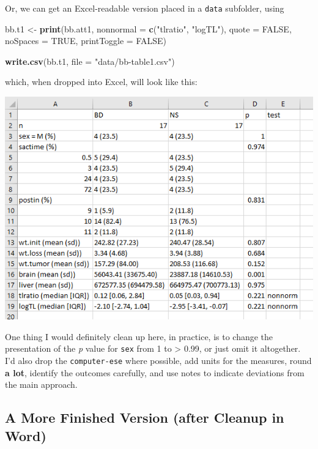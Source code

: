 \documentclass[]{book}
\newenvironment{Shaded}{\begin{snugshade}}{\end{snugshade}}
\newcommand{\KeywordTok}[1]{\textcolor[rgb]{0.13,0.29,0.53}{\textbf{#1}}}
\newcommand{\DataTypeTok}[1]{\textcolor[rgb]{0.13,0.29,0.53}{#1}}
\newcommand{\StringTok}[1]{\textcolor[rgb]{0.31,0.60,0.02}{#1}}
\newcommand{\OtherTok}[1]{\textcolor[rgb]{0.56,0.35,0.01}{#1}}
\newcommand{\NormalTok}[1]{#1}
\theoremstyle{definition}
\theoremstyle{definition}
\theoremstyle{definition}
\theoremstyle{remark}
\begin{document}
Or, we can get an Excel-readable version placed in a \texttt{data}
subfolder, using

\begin{Shaded}
\begin{Highlighting}[]
\NormalTok{bb.t1 <-}\StringTok{ }\KeywordTok{print}\NormalTok{(bb.att1, }\DataTypeTok{nonnormal =} \KeywordTok{c}\NormalTok{(}\StringTok{"tlratio"}\NormalTok{, }\StringTok{"logTL"}\NormalTok{), }\DataTypeTok{quote =} \OtherTok{FALSE}\NormalTok{,}
               \DataTypeTok{noSpaces =} \OtherTok{TRUE}\NormalTok{, }\DataTypeTok{printToggle =} \OtherTok{FALSE}\NormalTok{)}

\KeywordTok{write.csv}\NormalTok{(bb.t1, }\DataTypeTok{file =} \StringTok{"data/bb-table1.csv"}\NormalTok{)}
\end{Highlighting}
\end{Shaded}

which, when dropped into Excel, will look like this:

\includegraphics[width=0.9\linewidth]{images/bb-table1inExcel}

One thing I would definitely clean up here, in practice, is to change
the presentation of the \emph{p} value for \texttt{sex} from 1 to
\textgreater{} 0.99, or just omit it altogether. I'd also drop the
\texttt{computer-ese} where possible, add units for the measures, round
\textbf{a lot}, identify the outcomes carefully, and use notes to
indicate deviations from the main approach.

\subsection{A More Finished Version (after Cleanup in
Word)}\label{a-more-finished-version-after-cleanup-in-word}
\end{document}
